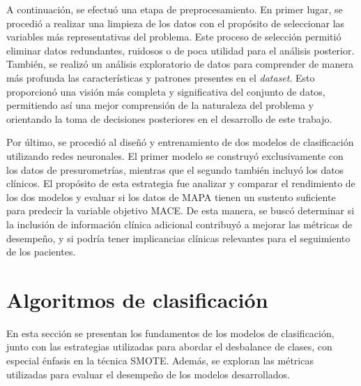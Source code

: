 A continuación, se efectuó una etapa de preprocesamiento. En primer lugar, se procedió a realizar 
una limpieza de los datos con el propósito de seleccionar las variables más representativas del 
problema. Este proceso de selección permitió eliminar datos redundantes, ruidosos o de poca 
utilidad para el análisis posterior. También, se realizó un análisis exploratorio de datos 
para comprender de manera más profunda las características y patrones presentes en el \textit{dataset}. 
Esto proporcionó una visión más completa y significativa del conjunto de datos, permitiendo 
así una mejor comprensión de la naturaleza del problema y orientando la toma de decisiones 
posteriores en el desarrollo de este trabajo.

Por último, se procedió al diseñó y entrenamiento de dos modelos de clasificación utilizando 
redes neuronales. El primer modelo se construyó exclusivamente con los datos de presurometrías, 
mientras que el segundo también incluyó los datos clínicos. El propósito 
de esta estrategia fue analizar y comparar el rendimiento de los dos modelos y evaluar si los 
datos de MAPA tienen un sustento suficiente para predecir la variable objetivo MACE. De esta 
manera, se buscó determinar si la inclusión de información clínica adicional contribuyó a 
mejorar las métricas de desempeño, y si podría tener implicancias 
clínicas relevantes para el seguimiento de los pacientes.

\section{Algoritmos de clasificación}
\label{sec:Algoritmos de clasificación}

En esta sección se presentan los fundamentos de los modelos de clasificación, junto con las 
estrategias utilizadas para abordar el desbalance de clases, con especial énfasis en la técnica SMOTE. 
Además, se exploran las métricas utilizadas para evaluar el desempeño de los modelos desarrollados.



